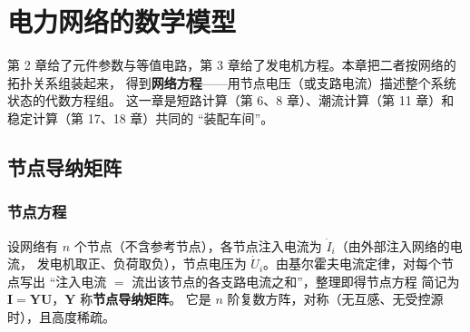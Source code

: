 ﻿%

\chapter{电力网络的数学模型}

第 2 章给了元件参数与等值电路，第 3 章给了发电机方程。本章把二者按网络的拓扑关系组装起来，
得到\textbf{网络方程}——用节点电压（或支路电流）描述整个系统状态的代数方程组。
这一章是短路计算（第 6、8 章）、潮流计算（第 11 章）和稳定计算（第 17、18 章）共同的
“装配车间”。

\section{节点导纳矩阵}

\subsection{节点方程}

设网络有 $n$ 个节点（不含参考节点），各节点注入电流为 $\dot I_i$（由外部注入网络的电流，
发电机取正、负荷取负），节点电压为 $\dot U_i$。由基尔霍夫电流定律，对每个节点写出
“注入电流 $=$ 流出该节点的各支路电流之和”，整理即得节点方程
简记为 $\boldsymbol I=\boldsymbol Y\boldsymbol U$，$\boldsymbol Y$ 称\textbf{节点导纳矩阵}。
它是 $n$ 阶复数方阵，对称（无互感、无受控源时），且高度稀疏。

